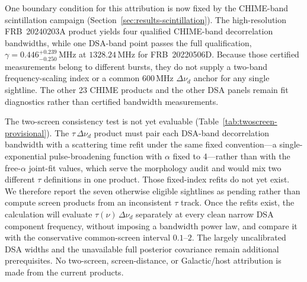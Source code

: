 %
%

One boundary condition for this attribution is now fixed by the CHIME-band
scintillation campaign (Section~\ref{sec:results-scintillation}). The
high-resolution FRB~20240203A product yields four qualified CHIME-band
decorrelation bandwidths, while one DSA-band point passes the full
qualification, $\gamma=0.446^{+0.239}_{-0.250}\,$MHz at $1328.24\,$MHz for
FRB~20220506D. Because those certified measurements belong to different
bursts, they do not supply a two-band frequency-scaling index or a common
$600\,$MHz $\Delta\nu_d$ anchor for any single sightline. The other 23 CHIME
products and the other DSA panels remain fit diagnostics rather than certified
bandwidth measurements.

The two-screen consistency test is not yet evaluable
(Table~\ref{tab:twoscreen-provisional}). The $\tau\,\Delta\nu_d$ product must
pair each DSA-band decorrelation bandwidth with a scattering time refit under
the same fixed convention---a single-exponential pulse-broadening function
with $\alpha$ fixed to 4---rather than with the free-$\alpha$ joint-fit
values, which serve the morphology audit and would mix two different $\tau$
definitions in one product. Those fixed-index refits do not yet exist. We
therefore report the seven otherwise eligible sightlines as pending rather
than compute screen products from an inconsistent $\tau$ track. Once the
refits exist, the calculation will evaluate $\tau(\nu)\,\Delta\nu_d$
separately at every clean narrow DSA component frequency, without imposing a
bandwidth power law, and compare it with the conservative common-screen
interval $0.1$--$2$. The largely uncalibrated DSA widths and the unavailable
full posterior covariance remain additional prerequisites. No two-screen,
screen-distance, or Galactic/host attribution is made from the current
products.

